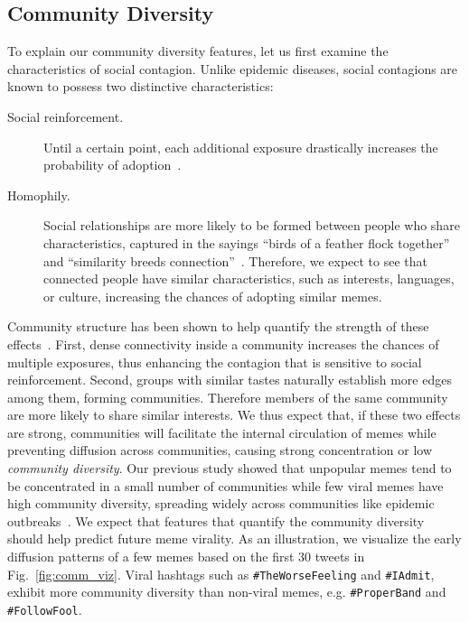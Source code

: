 \documentclass[letterpaper]{article}
\begin{document}
\subsection{Community Diversity}

To explain our community diversity features, let us first examine the characteristics of social contagion. Unlike epidemic diseases, social contagions are known to possess two distinctive characteristics:

\begin{description}

\item[Social reinforcement.] Until a certain point, each additional exposure drastically increases the probability of adoption~\cite{Centola2007weakTies,bakshy2009adoption,romero_differences_2011,Centola2010SpreadExp}.

\item[Homophily.] Social relationships are more likely to be formed between people who share characteristics, captured in the sayings ``birds of a feather flock together'' and ``similarity breeds connection''~\cite{McPherson2001homophily,Centola2011homophily}. Therefore, we expect to see that connected people have similar characteristics, such as interests, languages, or culture, increasing the chances of adopting similar memes.

\end{description}

Community structure has been shown to help quantify the strength of these effects~\cite{colbaugh2012early,weng2013viral}.
First, dense connectivity inside a community increases the chances of multiple exposures, thus enhancing the contagion that is sensitive to social reinforcement. Second, groups with similar tastes naturally establish more edges among them, forming communities. Therefore members of the same community are more likely to share similar interests. We thus expect that, if these two effects are strong, communities will facilitate the internal circulation of memes while preventing diffusion across communities, causing strong concentration or low \emph{community diversity}.
Our previous study showed that unpopular memes tend to be concentrated in a small number of communities while few viral memes have high community diversity, spreading widely across communities like epidemic outbreaks~\cite{weng2013viral}. We expect that features that quantify the community diversity should help predict future meme virality. As an illustration, we visualize the early diffusion patterns of a few memes based on the first 30 tweets in Fig.~\ref{fig:comm_viz}. Viral hashtags such as \texttt{\#TheWorseFeeling} and \texttt{\#IAdmit}, exhibit more community diversity than non-viral me\-mes, e.g. \texttt{\#ProperBand} and \texttt{\#FollowFool}.
\end{document}
